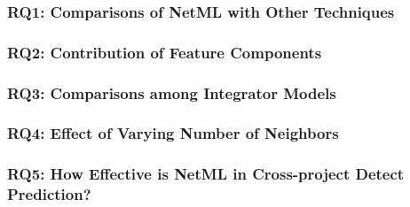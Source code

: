 \subsubsection{RQ1: Comparisons of NetML with Other Techniques}
\label{sec:rq_benchmark}


%

\subsubsection{RQ2: Contribution of Feature Components}
\label{sec:rq_feature}


\subsubsection{RQ3: Comparisons among Integrator Models}
\label{sec:rq_integrator}


%

\subsubsection{RQ4: Effect of Varying Number of Neighbors}
\label{sec:rq2_neighbor}


\subsubsection{RQ5: How Effective is NetML in Cross-project Detect Prediction?}
\label{sec:rq5_cross-proj}


%

%

